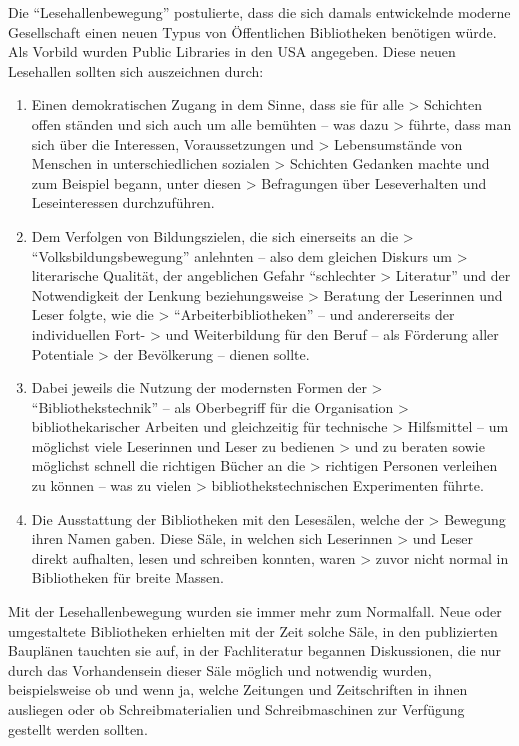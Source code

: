 \documentclass[a4paper,
fontsize=11pt,
oneside,
numbers=noperiodatend,
parskip=half-,
bibliography=totoc,
final
]{scrartcl}
\begin{document}
Die \enquote{Lesehallenbewegung} postulierte, dass die sich damals
entwickelnde moderne Gesellschaft einen neuen Typus von Öffentlichen
Bibliotheken benötigen würde. Als Vorbild wurden Public Libraries in den
USA angegeben. Diese neuen Lesehallen sollten sich auszeichnen durch:

\begin{enumerate}
\def\labelenumi{(\arabic{enumi})}
\item
  Einen demokratischen Zugang in dem Sinne, dass sie für alle
  \textgreater{} Schichten offen ständen und sich auch um alle bemühten
  -- was dazu \textgreater{} führte, dass man sich über die Interessen,
  Voraussetzungen und \textgreater{} Lebensumstände von Menschen in
  unterschiedlichen sozialen \textgreater{} Schichten Gedanken machte
  und zum Beispiel begann, unter diesen \textgreater{} Befragungen über
  Leseverhalten und Leseinteressen durchzuführen.
\item
  Dem Verfolgen von Bildungszielen, die sich einerseits an die
  \textgreater{} \enquote{Volksbildungsbewegung} anlehnten -- also dem
  gleichen Diskurs um \textgreater{} literarische Qualität, der
  angeblichen Gefahr \enquote{schlechter \textgreater{} Literatur} und
  der Notwendigkeit der Lenkung beziehungsweise \textgreater{} Beratung
  der Leserinnen und Leser folgte, wie die \textgreater{}
  \enquote{Arbeiterbibliotheken} -- und andererseits der individuellen
  Fort- \textgreater{} und Weiterbildung für den Beruf -- als Förderung
  aller Potentiale \textgreater{} der Bevölkerung -- dienen sollte.
\item
  Dabei jeweils die Nutzung der modernsten Formen der \textgreater{}
  \enquote{Bibliothekstechnik} -- als Oberbegriff für die Organisation
  \textgreater{} bibliothekarischer Arbeiten und gleichzeitig für
  technische \textgreater{} Hilfsmittel -- um möglichst viele Leserinnen
  und Leser zu bedienen \textgreater{} und zu beraten sowie möglichst
  schnell die richtigen Bücher an die \textgreater{} richtigen Personen
  verleihen zu können -- was zu vielen \textgreater{}
  bibliothekstechnischen Experimenten führte.
\item
  Die Ausstattung der Bibliotheken mit den Lesesälen, welche der
  \textgreater{} Bewegung ihren Namen gaben. Diese Säle, in welchen sich
  Leserinnen \textgreater{} und Leser direkt aufhalten, lesen und
  schreiben konnten, waren \textgreater{} zuvor nicht normal in
  Bibliotheken für breite Massen.
\end{enumerate}

Mit der Lesehallenbewegung wurden sie immer mehr zum Normalfall. Neue
oder umgestaltete Bibliotheken erhielten mit der Zeit solche Säle, in
den publizierten Bauplänen tauchten sie auf, in der Fachliteratur
begannen Diskussionen, die nur durch das Vorhandensein dieser Säle
möglich und notwendig wurden, beispielsweise ob und wenn ja, welche
Zeitungen und Zeitschriften in ihnen ausliegen oder ob
Schreibmaterialien und Schreibmaschinen zur Verfügung gestellt werden
sollten.
\end{document}
